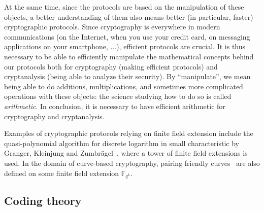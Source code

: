 At the same time, since the protocols are based on the manipulation of these
objects, a better understanding of them also means better (in particular,
faster) cryptographic protocols. Since cryptography is everywhere in modern
communications (on the Internet, when you use your credit card, on messaging
applications on your smartphone, ...), efficient protocols are crucial. It is
thus necessary to be able to efficiently manipulate the mathematical concepts
behind our protocols both for cryptography (making efficient protocols) and
cryptanalysis (being able to analyze their security). By ``manipulate'', we mean
being able to do additions, multiplications, and sometimes more complicated
operations with these objects: the science studying how to do so is called
\emph{arithmetic}. In conclusion, it is necessary to have efficient arithmetic
for cryptography and cryptanalysis.

Examples of cryptographic protocols relying on finite field extension include
the quasi-polynomial algorithm for discrete logarithm in small characteristic by
Granger, Kleinjung and Zumbrägel~\cite{GKZ14}, where a tower of finite field
extensions is used. In the domain of curve-based cryptography, pairing friendly
curves~\cite{Joux00, FST10} are also defined on some finite field extension
$\mathbb{F}_{q^k}$.

\subsection{Coding theory}
\label{sec:coding}

